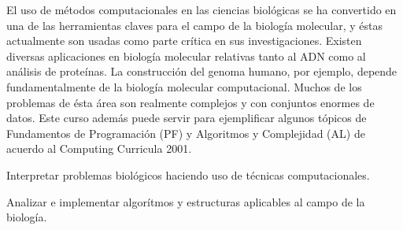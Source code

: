 \begin{syllabus}


\begin{justification}
El uso de métodos computacionales en las ciencias biológicas
se ha convertido en una de las herramientas claves para el
campo de la biología molecular, y éstas actualmente son usadas
como parte crítica en sus investigaciones. Existen diversas
aplicaciones en biología molecular relativas tanto al ADN como
al análisis de proteínas. La construcción del genoma humano,
por ejemplo, depende fundamentalmente de la biología molecular
computacional. Muchos de los problemas de ésta área son realmente
complejos y con conjuntos enormes de datos. Este curso además
puede servir para ejemplificar algunos tópicos de Fundamentos
de Programación (PF) y Algoritmos y Complejidad (AL) de
acuerdo al Computing Curricula 2001.
\end{justification}

\begin{goals}
\item Interpretar problemas biológicos haciendo uso de técnicas computacionales.
\item Analizar e implementar algorítmos y estructuras aplicables al campo de la biología.
\end{goals}

\begin{outcomes}
\end{outcomes}


\end{syllabus}
